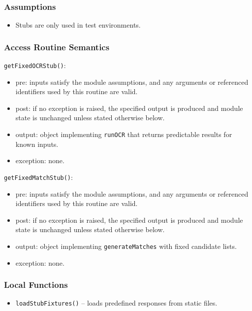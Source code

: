 \documentclass[12pt, titlepage]{article}
\begin{document}
\subsubsection{Assumptions}
\begin{itemize}
    \item Stubs are only used in test environments.
\end{itemize}

\subsubsection{Access Routine Semantics}

\noindent \texttt{getFixedOCRStub()}:
\begin{itemize}
    \item pre: inputs satisfy the module assumptions, and any arguments or referenced identifiers used by this routine are valid.
    \item post: if no exception is raised, the specified output is produced and module state is unchanged unless stated otherwise below.
    \item output: object implementing \texttt{runOCR} that returns predictable results for known inputs.
    \item exception: none.
\end{itemize}

\noindent \texttt{getFixedMatchStub()}:
\begin{itemize}
    \item pre: inputs satisfy the module assumptions, and any arguments or referenced identifiers used by this routine are valid.
    \item post: if no exception is raised, the specified output is produced and module state is unchanged unless stated otherwise below.
    \item output: object implementing \texttt{generateMatches} with fixed candidate lists.
    \item exception: none.
\end{itemize}

\subsubsection{Local Functions}
\begin{itemize}
    \item \texttt{loadStubFixtures()} – loads predefined responses from static files.
\end{itemize}
\end{document}
